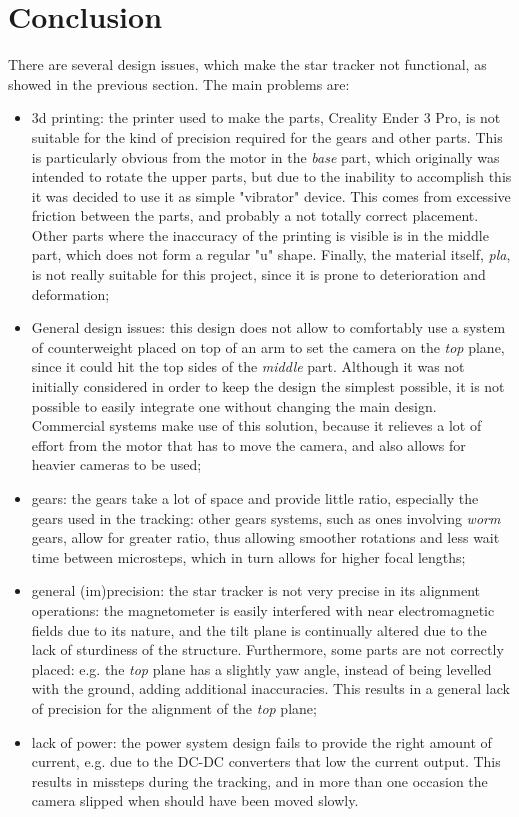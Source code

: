 \documentclass[]{article}
\begin{document}
\section{Conclusion}

There are several design issues, which make the star tracker not functional, as showed in the previous section. The main problems are:

\begin{itemize}
	\item 3d printing: the printer used to make the parts, Creality Ender 3 Pro, is not suitable for the kind of precision required for the gears and other parts. This is particularly obvious from the motor in the \textit{base} part, which originally was intended to rotate the upper parts, but due to the inability to accomplish this it was decided to use it as simple "vibrator" device. This comes from excessive friction between the parts, and probably a not totally correct placement. Other parts where the inaccuracy of the printing is visible is in the middle part, which does not form a regular "u" shape. Finally, the material itself, \textit{pla}, is not really suitable for this project, since it is prone to deterioration and deformation;
	\item General design issues: this design does not allow to comfortably use a system of counterweight placed on top of an arm to set the camera on the \textit{top} plane, since it could hit the top sides of the \textit{middle} part. Although it was not initially considered in order to keep the design the simplest possible, it is not possible to easily integrate one without changing the main design. Commercial systems make use of this solution, because it relieves a lot of effort from the motor that has to move the camera, and also allows for heavier cameras to be used;
	\item gears: the gears take a lot of space and provide little ratio, especially the gears used in the tracking: other gears systems, such as ones involving \textit{worm} gears, allow for greater ratio, thus allowing smoother rotations and less wait time between microsteps, which in turn allows for higher focal lengths;
	\item general (im)precision: the star tracker is not very precise in its alignment operations: the magnetometer is easily interfered with near electromagnetic fields due to its nature, and the tilt plane is continually altered due to the lack of sturdiness of the structure. Furthermore, some parts are not correctly placed: e.g. the \textit{top} plane has a slightly yaw angle, instead of being levelled with the ground, adding additional inaccuracies. This results in a general lack of precision for the alignment of the \textit{top} plane;
	\item lack of power: the power system design fails to provide the right amount of current, e.g. due to the DC-DC converters that low the current output. This results in missteps during the tracking, and in more than one occasion the camera slipped when should have been moved slowly. 
\end{itemize}
\end{document}

